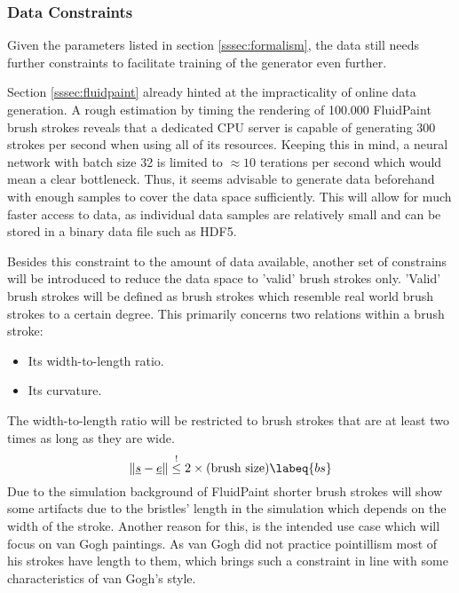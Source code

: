 \subsubsection{Data Constraints}

Given the parameters listed in section \ref{sssec:formalism}, the data still needs further
constraints to facilitate training of the generator even further.

Section \ref{sssec:fluidpaint} already hinted at the impracticality of online data generation.
A rough estimation by timing the rendering of 100.000 FluidPaint brush strokes reveals
that a dedicated CPU server is capable of generating 300 strokes per second when
using all of its resources.
Keeping this in mind, a neural network with batch size 32 is limited to
$\approx 10$ terations per second which would mean a clear bottleneck.
Thus, it seems advisable to generate data beforehand with enough samples to cover
the data space sufficiently.
This will allow for much faster access to data, as individual data samples are relatively
small and can be stored in a binary data file such as HDF5.

Besides this constraint to the amount of data available, another set of constrains
will be introduced to reduce the data space to 'valid' brush strokes only.
'Valid' brush strokes will be defined as brush strokes which resemble real world
brush strokes to a certain degree.
This primarily concerns two relations within a brush stroke:
\begin{itemize}
    \item Its width-to-length ratio.
    \item Its curvature.
\end{itemize}

The width-to-length ratio will be restricted to brush strokes that are at least
two times as long as they are wide.
\begin{equation}
\norm{\vec{s} - \vec{e}} \overset{!}{\leq}  2 \times (\text{brush size}) \labeq{bs}
\end{equation}
Due to the simulation background of FluidPaint shorter brush strokes will show some
artifacts due to the bristles' length in the simulation which depends on the width
of the stroke.
Another reason for this, is the intended use case which will focus on van Gogh paintings.
As van Gogh did not practice pointillism most of his strokes have length to them,
which brings such a constraint in line with some characteristics of van Gogh's style.

